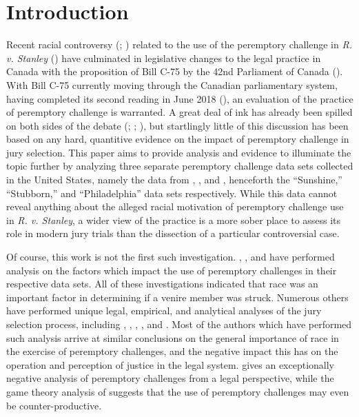\section{Introduction} \label{c:introduction}

Recent racial controversy (\cite{fiverejected}; \cite{fraughthistory}) related to the use of the peremptory challenge in \textit{R. v. Stanley} (\cite{GeraldStanleyVerdict}) have culminated in legislative changes to the legal practice in Canada with the proposition of Bill C-75 by the 42nd Parliament of Canada (\cite{billc75}). With Bill C-75 currently moving through the Canadian parliamentary system, having completed its second reading in June
2018 (\cite{c75legisinfo}), an evaluation of the practice of peremptory challenge is warranted. A great deal of ink has
already been spilled on both sides of the debate (\cite{peremparegood}; \cite{bothwrong}; \cite{goodfirststep}), but startlingly
little of this discussion has been based on any hard, quantitive evidence on the impact of peremptory challenge in jury
selection. This paper aims to provide analysis and evidence to illuminate the topic further by analyzing three separate peremptory
challenge data sets collected in the United States, namely the data from \cite{JurySunshineProj}, \cite{StubbornLegacy}, and
\cite{PerempChalMurder}, henceforth the ``Sunshine,'' ``Stubborn,'' and ``Philadelphia'' data sets respectively. While this data cannot reveal anything about the alleged racial motivation of peremptory challenge use in
\textit{R. v. Stanley}, a wider view of the practice is a more sober
place to assess its role in modern jury trials than the dissection of a particular controversial case.

Of course, this work is not the first such investigation. \cite{JurySunshineProj}, \cite{StubbornLegacy}, and
\cite{PerempChalMurder} have performed analysis on the factors which
impact the use of peremptory challenges in their respective data
sets. All of these
investigations indicated that race was an important factor in
determining if a venire member was struck. Numerous others have
performed unique legal, empirical, and analytical analyses of the jury
selection process, including
\cite{hoffman1997}, \cite{vandykejurysel}, \cite{hansvidjudging}, \cite{brown1978}, and \cite{ford2010}. Most of the authors which have
performed such analysis arrive at similar conclusions on the general importance of race in the exercise of peremptory challenges,
and the negative impact this has on the operation and perception of justice in the legal system. \cite{hoffman1997} gives an
exceptionally negative analysis of peremptory challenges from a legal perspective, while the game theory analysis of
\cite{ford2010} suggests that the use of peremptory challenges may even be counter-productive.

